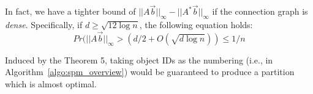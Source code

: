 In fact, we have a tighter bound of $||A\vec{b}||_\infty -||A^*\vec{b}||_\infty$ if 
the connection graph is \emph{dense}. Specifically, if $d\geq \sqrt{12\log n}$, the following
equation holds:
\begin{equation*}
Pr(||A\vec{b}||_\infty > (d/2 + O(\sqrt{d\log n})) \leq 1/n
\end{equation*}

Induced by the Theorem 5, taking object IDs as the numbering (i.e., in Algorithm~\ref{algo:spm_overview})
would be guaranteed to produce a partition which is almost optimal.
%
%

